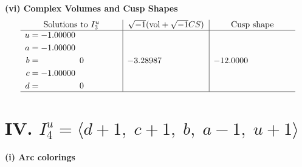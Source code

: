 \documentclass[1p]{elsarticle_modified}
\theoremstyle{definition}
\newcommand{\I}{\sqrt{-1}}
\begin{document}
\newpage\flushleft \textbf{(vi) Complex Volumes and Cusp Shapes}
$$\begin{array}{c|c|c}  
\text{Solutions to }I^u_{3}& \I (\text{vol} + \sqrt{-1}CS) & \text{Cusp shape}\\
 \hline 
\begin{aligned}
u &= -1.00000\phantom{ +0.000000I} \\
a &= -1.00000\phantom{ +0.000000I} \\
b &= \phantom{-0.000000 } 0 \\
c &= -1.00000\phantom{ +0.000000I} \\
d &= \phantom{-0.000000 } 0\end{aligned}
 & -3.28987\phantom{ +0.000000I} & -12.0000\phantom{ +0.000000I}\\
 \hline 
 \end{array}$$\newpage\newpage\renewcommand{\arraystretch}{1}
\centering \section*{IV. $I^u_{4}= \langle d+1,\;c+1,\;b,\;a-1,\;u+1 \rangle$}
\flushleft \textbf{(i) Arc colorings}\\
\end{document}
